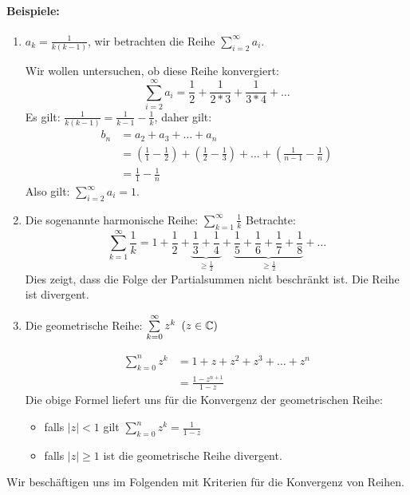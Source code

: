 \paragraph{Beispiele:}
\begin{enumerate}
	\item $a_k=\frac{1}{k(k-1)}$, wir betrachten die Reihe $\sum\limits_{i=2}^\infty a_i$.

	Wir wollen untersuchen, ob diese Reihe konvergiert:
	\begin{equation*}
		\sum\limits_{i=2}^\infty a_i=\frac12 + \frac{1}{2*3} + \frac{1}{3*4} + \ldots
	\end{equation*}
	Es gilt: $\frac{1}{k(k-1)}=\frac{1}{k-1}-\frac{1}{k}$, daher gilt:
	\begin{align*}
		b_n&=a_2+a_3+\ldots+a_n\\
		&=(\frac{1}{1}-\frac{1}{2})+(\frac{1}{2}-\frac{1}{3})+\ldots+(\frac{1}{n-1}-\frac{1}{n})\\
		&=\frac{1}{1}-\frac{1}{n}
	\end{align*}
	Also gilt: $\sum\limits_{i=2}^\infty a_i = 1$.

	\item Die sogenannte harmonische Reihe:
	$\sum\limits_{k=1}^\infty \frac 1k$
	Betrachte:
	\begin{equation*}
		\sum\limits_{k=1}^\infty \frac 1k=1+\frac12+\underbrace{\frac13+\frac14}_{\geq \frac12}+\underbrace{\frac15+\frac16+\frac17+\frac18}_{\geq\frac12}+\ldots
	\end{equation*}
	Dies zeigt, dass die Folge der Partialsummen nicht beschränkt ist. Die Reihe ist divergent.

	\item Die geometrische Reihe:
	$\sum\limits_{k=0}^\infty z^k \enspace(z\in\mathbb{C})$

	\begin{align*}
		\sum\limits_{k=0}^n z^k &=1+z+z^2+z^3+\ldots+z^n\\
		&=\frac{1-z^{n+1}}{1-z}
	\end{align*}
	Die obige Formel liefert uns für die Konvergenz der geometrischen Reihe:
	\begin{itemize}
		\item falls $|z|<1$ gilt $\sum_{k=0}^n z^k=\frac1{1-z}$
		\item falls $|z|\geq 1$ ist die geometrische Reihe divergent.
	\end{itemize}
\end{enumerate}
Wir beschäftigen uns im Folgenden mit Kriterien für die Konvergenz von Reihen.
